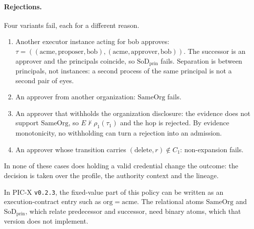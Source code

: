 \documentclass[10pt,twocolumn]{article}
\begin{document}
\paragraph{Rejections.}
Four variants fail, each for a different reason.
\begin{enumerate}
    \item Another executor instance acting for bob approves:
    \(\tau=((\mathrm{acme},\mathrm{proposer},\mathrm{bob}),
    (\mathrm{acme},\mathrm{approver},\mathrm{bob}))\). The successor is an
    approver and the principals coincide, so \(\mathrm{SoD}_{\mathrm{prin}}\)
    fails. Separation is between principals, not instances: a second process of
    the same principal is not a second pair of eyes.
    \item An approver from another organization: \(\mathrm{SameOrg}\) fails.
    \item An approver that withholds the organization disclosure: the evidence
    does not support \(\mathrm{SameOrg}\), so \(E\nvdash\rho_1(\tau_1)\) and the
    hop is rejected. By evidence monotonicity, no withholding can turn a
    rejection into an admission.
    \item An approver whose transition carries
    \((\mathrm{delete},r)\notin C_1\): non-expansion fails.
\end{enumerate}
In none of these cases does holding a valid credential change the outcome: the
decision is taken over the profile, the authority context and the lineage.

In PIC-X \texttt{v0.2.3}, the fixed-value part of this policy can be written as
an execution-contract entry such as \(\mathrm{org}=\mathrm{acme}\). The
relational atoms \(\mathrm{SameOrg}\) and \(\mathrm{SoD}_{\mathrm{prin}}\),
which relate predecessor and successor, need binary atoms, which that version
does not implement.
\end{document}
